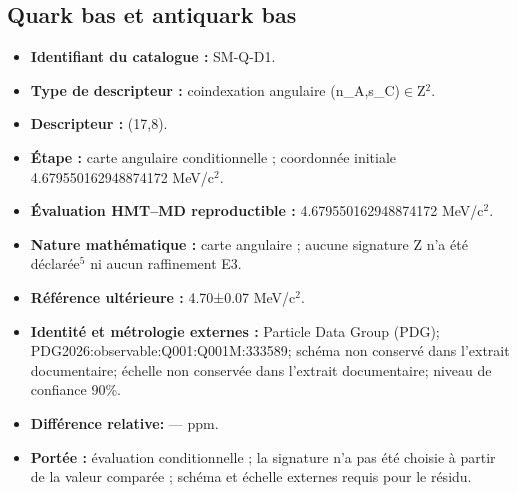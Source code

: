 \subsection{Quark bas et antiquark bas}
\begin{itemize}
\item \textbf{Identifiant du catalogue :} SM-Q-D1.
\item \textbf{Type de descripteur :} coindexation angulaire (n\_A,s\_C)\(\in\)Z\({}^{2}\).
\item \textbf{Descripteur :} (17,8).
\item \textbf{Étape :} carte angulaire conditionnelle ; coordonnée initiale 4.679550\allowbreak{}162948\allowbreak{}874172 MeV/c\({}^{2}\).
\item \textbf{Évaluation HMT--MD reproductible :} 4.679550\allowbreak{}162948\allowbreak{}874172 MeV/c\({}^{2}\).
\item \textbf{Nature mathématique :} carte angulaire ; aucune signature Z n’a été déclarée\({}^{5}\) ni aucun raffinement E3.
\item \textbf{Référence ultérieure :} 4.70±\allowbreak{}0.07 MeV/c\({}^{2}\).
\item \textbf{Identité et métrologie externes :} Particle Data Group (PDG); PDG2026:\allowbreak{}observable:\allowbreak{}Q001:\allowbreak{}Q001M:\allowbreak{}333589; schéma non conservé dans l’extrait documentaire; échelle non conservée dans l’extrait documentaire; niveau de confiance 90\%.
\item \textbf{Différence relative:} --- ppm.
\item \textbf{Portée :} évaluation conditionnelle ; la signature n’a pas été choisie à partir de la valeur comparée ; schéma et échelle externes requis pour le résidu.
\end{itemize}
